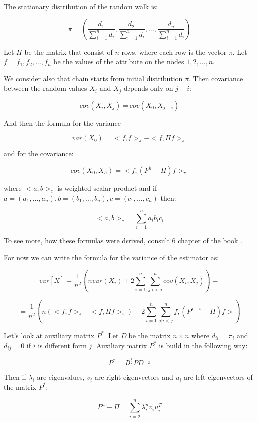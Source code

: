 \documentclass[12pt]{report}
\begin{document}
The stationary distribution of the random walk is:

$$\pi = \left( \frac{d_1}{\sum_{i=1}^n d_i}, \frac{d_2}{\sum_{i=1}^n d_i},..., \frac{d_n}{\sum_{i=1}^n d_i}\right)$$
  

Let $\Pi$ be the matrix that consist of $n$ rows, where each row is the vector $\pi$. Let $f = {f_1 , f_2, ..., f_n}$ be the values of the attribute on the nodes $1, 2, ..., n$.

We consider also that chain starts from initial distribution $\pi$. Then covariance between the random values $X_i$ and $X_j$ depends only on $j-i$:

$$cov(X_i, X_j) = cov (X_0, X_{j-i})$$

And then the formula for the variance

$$var(X_0) = <f, f>_{\pi} - <f, \Pi f>_{\pi}$$

and for the covariance:

$$cov(X_0, X_h) = <f, (P^h - \Pi)f>_{\pi}$$

where $<a,b>_c$ is weighted scalar product and if $a = (a_1, ..., a_n), b = (b_1, ..., b_n), c = (c_1, ..., c_n)$ then:

$$<a,b>_c = \sum_{i = 1}^n a_i b_i c_i$$

To see more, how these formulas were derived, consult 6 chapter of the book \cite{bremaud2013markov}.

For now we can write the formula for the variance of the estimator as:

$$ var\left[\bar{X} \right] = \frac{1}{n^2} \left( nvar(X_i) + 2\sum_{i=1}^n \sum_{j|i < j}^n cov(X_i, X_j)\right) = $$

\begin{equation}
 = \frac{1}{n^2} \left( n(<f, f>_{\pi} - <f, \Pi f>_{\pi}) + 2\sum_{i=1}^n \sum_{j|i < j}^n  f, (P^{j-i} - \Pi)f> \right)
\end{equation}\label{eq:varGen}



Let's look at auxiliary matrix $P^*$. Let $D$ be the matrix $n \times n$ where $d_{ii} = \pi_i$ and $d_{ij} = 0$ if $i$ is different form $j$. Auxiliary matrix $P^*$ is build in the following way:

$$P^* = D^{\frac{1}{2}} P D^{-\frac{1}{2}}$$


Then if $\lambda_i$ are eigenvalues, $v_i$ are right eigenvectors and $u_i$ are left eigenvectors of the matrix $P^*$:

\begin{equation}
P^h - \Pi = \sum_{i = 2}^n \lambda_i^n v_i u_i^T
\end{equation}\label{eq:varGen2}
\end{document}
